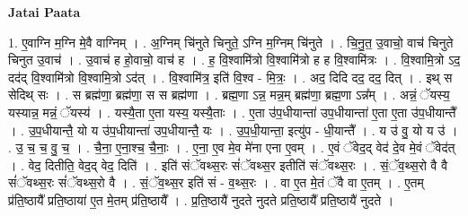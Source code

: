 \documentclass[17pt]{extarticle}
\begin{document}
\textbf{Jatai Paata} \newline

1. ए॒वाग्नि म॒ग्नि मे॒वै वाग्निम् । . अ॒ग्निम् चि॑नुते चिनुते॒ ऽग्नि म॒ग्निम् चि॑नुते । . चि॒नु॒त॒ उ॒वाचो॒ वाच॑ चिनुते चिनुत उ॒वाच॑ । . उ॒वाच॑ ह हो॒वाचो॒ वाच॑ ह । . ह॒ वि॒श्वामि॑त्रो वि॒श्वामि॑त्रो ह ह वि॒श्वामि॑त्रः । . वि॒श्वामि॒त्रो ऽद॒ दद॑द् वि॒श्वामि॑त्रो वि॒श्वामि॒त्रो ऽद॑त् । . वि॒श्वामि॑त्र॒ इति॑ वि॒श्व - मि॒त्रः॒ । . अद॒ दिदि दद॒ दद॒ दित् । . इथ् स सेदिथ् सः । . स ब्रह्म॑णा॒ ब्रह्म॑णा॒ स स ब्रह्म॑णा । . ब्रह्म॒णा ऽन्न॒ मन्न॒म् ब्रह्म॑णा॒ ब्रह्म॒णा ऽन्न᳚म् । . अन्नं॒ ॅयस्य॒ यस्यान्न॒ मन्नं॒ ॅयस्य॑ । . यस्यै॒ता ए॒ता यस्य॒ यस्यै॒ताः । . ए॒ता उ॑प॒धीयान्ता॑ उप॒धीयान्ता॑ ए॒ता ए॒ता उ॑प॒धीयान्तै᳚ । . उ॒प॒धीयान्तै॒ यो य उ॑प॒धीयान्ता॑ उप॒धीयान्तै॒ यः । . उ॒प॒धी॒यान्ता॒ इत्यु॑प - धी॒यान्तै᳚ । . य उ॑ वु॒ यो य उ॑ । . उ॒ च॒ च॒ वु॒ च॒ । . चै॒ना॒ ए॒ना॒श्च॒ चै॒नाः॒ । . ए॒ना॒ ए॒व मे॒व मे॑ना एना ए॒वम् । . ए॒वं ॅवेद॒द् वेद॑ दे॒व मे॒वं ॅवेद॑त् । . वेद॒ दितीति॒ वेद॒द् वेद॒ दिति॑ । . इति॑ संॅवथ्स॒रः सं॑ॅवथ्स॒र इतीति॑ संॅवथ्स॒रः । . सं॒ॅव॒थ्स॒रो वै वै सं॑ॅवथ्स॒रः सं॑ॅवथ्स॒रो वै । . सं॒ॅव॒थ्स॒र इति॑ सं - व॒थ्स॒रः । . वा ए॒त मे॒तं ॅवै वा ए॒तम् । . ए॒तम् प्र॑ति॒ष्ठायै᳚ प्रति॒ष्ठाया॑ ए॒त मे॒तम् प्र॑ति॒ष्ठायै᳚ । . प्र॒ति॒ष्ठायै॑ नुदते नुदते प्रति॒ष्ठायै᳚ प्रति॒ष्ठायै॑ नुदते । \newline
\end{document}
